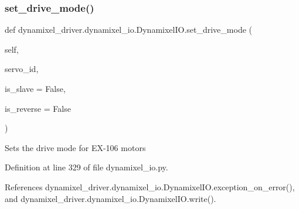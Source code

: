 \subsubsection{\texorpdfstring{set\+\_\+drive\+\_\+mode()}{set\_drive\_mode()}}
{\footnotesize\ttfamily def dynamixel\+\_\+driver.\+dynamixel\+\_\+io.\+Dynamixel\+I\+O.\+set\+\_\+drive\+\_\+mode (\begin{DoxyParamCaption}\item[{}]{self,  }\item[{}]{servo\+\_\+id,  }\item[{}]{is\+\_\+slave = {\ttfamily False},  }\item[{}]{is\+\_\+reverse = {\ttfamily False} }\end{DoxyParamCaption})}

\begin{DoxyVerb}Sets the drive mode for EX-106 motors
\end{DoxyVerb}
 

Definition at line 329 of file dynamixel\+\_\+io.\+py.



References dynamixel\+\_\+driver.\+dynamixel\+\_\+io.\+Dynamixel\+I\+O.\+exception\+\_\+on\+\_\+error(), and dynamixel\+\_\+driver.\+dynamixel\+\_\+io.\+Dynamixel\+I\+O.\+write().


